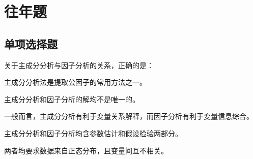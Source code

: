 
\label{chapter:1}

\section{往年题}

\par\addvspace{6pt}\noindent\begin{minipage}{\linewidth}

\subsection{单项选择题}


关于主成分分析与因子分析的关系，正确的是：


\begin{choices}

\item 主成分分析法是提取公因子的常用方法之一。

\item 主成分分析和因子分析的解均不是唯一的。

\item 一般而言，主成分分析有利于变量关系解释，而因子分析有利于变量信息综合。

\item 主成分分析和因子分析均含参数估计和假设检验两部分。

\item 两者均要求数据来自正态分布，且变量间互不相关。

\end{choices}

\end{minipage}\par\vspace{4pt}

